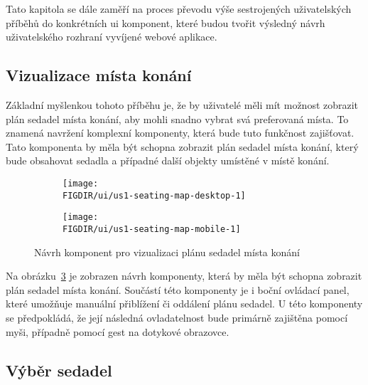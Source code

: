 Tato kapitola se dále zaměří na proces převodu výše sestrojených uživatelských příběhů do konkrétních \ac{ui} komponent, které budou tvořit výsledný návrh uživatelského rozhraní vyvíjené webové aplikace.

\subsection{Vizualizace místa konání}
\label{subsec:narvh-ui-transformace-uzivatelskych-pribehu-vizualizace-mista-konani}
\userstoryvenuemap

Základní myšlenkou tohoto příběhu je, že by uživatelé měli mít možnost zobrazit plán sedadel místa konání, aby mohli snadno vybrat svá preferovaná místa.
To znamená navržení komplexní komponenty, která bude tuto funkčnost zajišťovat.
Tato komponenta by měla být schopna zobrazit plán sedadel místa konání, který bude obsahovat sedadla a případné další objekty umístěné v místě konání.

\begin{figure}[H]
    \centering
    \begin{subfigure}{0.775\textwidth}
        \texttt{[image: \\FIGDIR/ui/us1-seating-map-desktop-1]}
        \label{fig:us1-seating-map-desktop-1}
    \end{subfigure}
    \begin{subfigure}{0.2\textwidth}
        \texttt{[image: \\FIGDIR/ui/us1-seating-map-mobile-1]}
        \label{fig:us1-seating-map-mobile-1}
    \end{subfigure}
    \caption{Návrh komponent pro vizualizaci plánu sedadel místa konání}
    \label{fig:us1-seating-map}
\end{figure}

Na obrázku~\ref{fig:us1-seating-map} je zobrazen návrh komponenty, která by měla být schopna zobrazit plán sedadel místa konání.
Součástí této komponenty je i boční ovládací panel, které umožňuje manuální přiblížení či oddálení plánu sedadel.
U této komponenty se předpokládá, že její následná ovladatelnost bude primárně zajištěna pomocí myši, případně pomocí gest na dotykové obrazovce.

\subsection{Výběr sedadel}
\label{subsec:narvh-ui-transformace-uzivatelskych-pribehu-vyber-sedadel}
\userstoryseatselection

